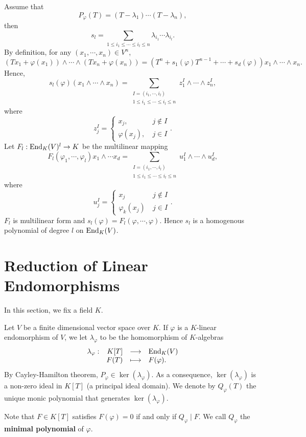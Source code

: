 \begin{remark}
    Assume that
    $$P_{\varphi} (T) = (T - \lambda_1) \cdots (T - \lambda_n),$$
    then
    $$s_{l} = \sum_{1 \le i_1 \le \cdots \le i_{l} \le n} \lambda_{i_1} \cdots \lambda_{i_{l}}.$$
    By definition, for any $(x_{1},\cdots,x_{n}) \in V^n$,
    $$(Tx_1 + \varphi(x_1)) \wedge \cdots \wedge (Tx_n + \varphi(x_n)) = (T^n + s_1(\varphi) T^{n-1} + \cdots + s_d(\varphi)) x_1 \wedge \cdots \wedge x_{n}.$$
    Hence,
    $$s_l (\varphi)(x_1 \wedge \cdots \wedge x_n) = \sum_{\substack{I = (i_1,\cdots,i_{l})\\1\le i_1 \le \cdots \le i_{l} \le n}} z_1^I \wedge \cdots \wedge z_n^I,$$
    where 
    $$z_j^I = 
    \begin{cases}
        x_j, \ &j \notin I\\
        \varphi(x_j), \ &j \in I
    \end{cases}.$$
    Let $F_{l} : \operatorname{\mathrm{End}}_{K}(V)^l \rightarrow K$ be the multilinear mapping
    $$F_{l}(\varphi_1, \cdots, \varphi_l) x_1 \wedge \cdots x_d = \sum_{\substack{I = (i_1,\cdots,i_{l})\\1\le i_1 \le \cdots \le i_{l} \le n}} u_1^I \wedge \cdots \wedge u_d^I,$$
    where 
    $$u_j^I = 
    \begin{cases}
        x_j \ &j \notin I\\
        \varphi_k(x_j) \ &j \in I
    \end{cases}.$$
    $F_l$ is multilinear form and $s_l (\varphi) = F_{l}(\varphi,\cdots,\varphi)$.
    Hence $s_l$ is a homogenous polynomial of degree $l$ on $\operatorname{\mathrm{End}}_{K}(V)$.
\end{remark}


\section{Reduction of Linear Endomorphisms}


In this section, we fix a field $K$.

\begin{definitionenv}\label{def:6.3.1}
    Let $V$ be a finite dimensional vector space over $K$.
    If $\varphi$ is a $K$-linear endomorphism of $V$,
    we let $\lambda_{\varphi}$ to be the homomorphism of $K$-algebras
    $$\begin{array}{rrcl}
        \lambda_{\varphi} : & K[T] & \longrightarrow & \operatorname{\mathrm{End}}_{K}(V)\\
        & F(T) & \longmapsto & F(\varphi).
    \end{array}$$
    By Cayley-Hamilton theorem, $P_{\varphi} \in \ker(\lambda_{\varphi})$.
    As a consequence, $\ker (\lambda_{\varphi})$ is a non-zero ideal in $K[T]$ (a principal ideal domain).
    We denote by $Q_{\varphi}(T)$ the unique monic polynomial that generates $\ker(\lambda_{\varphi})$.
    
    \quad Note that $F \in K[T]$ satisfies $F(\varphi) = 0$ if and only if $Q_{\varphi} \mid F$.
    We call $Q_\varphi$ the \textbf{minimal polynomial} of $\varphi$.
\end{definitionenv}

